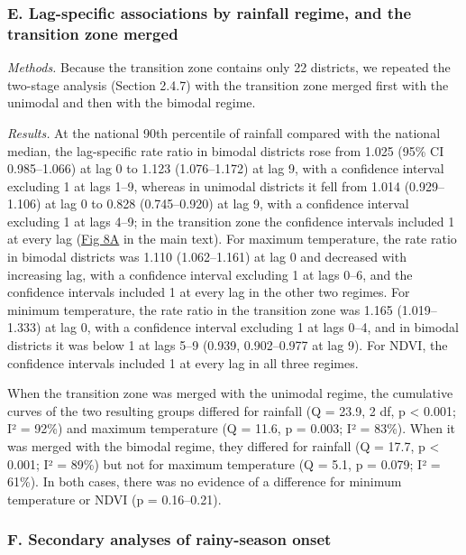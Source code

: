\documentclass[11pt,a4paper]{article}
\begin{document}
\subsubsection*{E. Lag-specific associations by rainfall regime, and the transition zone merged}

\emph{Methods.} Because the transition zone contains only 22 districts, we repeated the two-stage analysis (Section 2.4.7) with the transition zone merged first with the unimodal and then with the bimodal regime.

\emph{Results.} At the national 90th percentile of rainfall compared with the national median, the lag-specific rate ratio in bimodal districts rose from 1.025 (95\% CI 0.985--1.066) at lag 0 to 1.123 (1.076--1.172) at lag 9, with a confidence interval excluding 1 at lags 1--9, whereas in unimodal districts it fell from 1.014 (0.929--1.106) at lag 0 to 0.828 (0.745--0.920) at lag 9, with a confidence interval excluding 1 at lags 4--9; in the transition zone the confidence intervals included 1 at every lag (\hyperref[fig8]{Fig 8A} in the main text). For maximum temperature, the rate ratio in bimodal districts was 1.110 (1.062--1.161) at lag 0 and decreased with increasing lag, with a confidence interval excluding 1 at lags 0--6, and the confidence intervals included 1 at every lag in the other two regimes. For minimum temperature, the rate ratio in the transition zone was 1.165 (1.019--1.333) at lag 0, with a confidence interval excluding 1 at lags 0--4, and in bimodal districts it was below 1 at lags 5--9 (0.939, 0.902--0.977 at lag 9). For NDVI, the confidence intervals included 1 at every lag in all three regimes.

When the transition zone was merged with the unimodal regime, the cumulative curves of the two resulting groups differed for rainfall (Q = 23.9, 2 df, p \textless{} 0.001; I² = 92\%) and maximum temperature (Q = 11.6, p = 0.003; I² = 83\%). When it was merged with the bimodal regime, they differed for rainfall (Q = 17.7, p \textless{} 0.001; I² = 89\%) but not for maximum temperature (Q = 5.1, p = 0.079; I² = 61\%). In both cases, there was no evidence of a difference for minimum temperature or NDVI (p = 0.16--0.21).

\label{s1text-f}

\subsubsection*{F. Secondary analyses of rainy-season onset}
\end{document}

